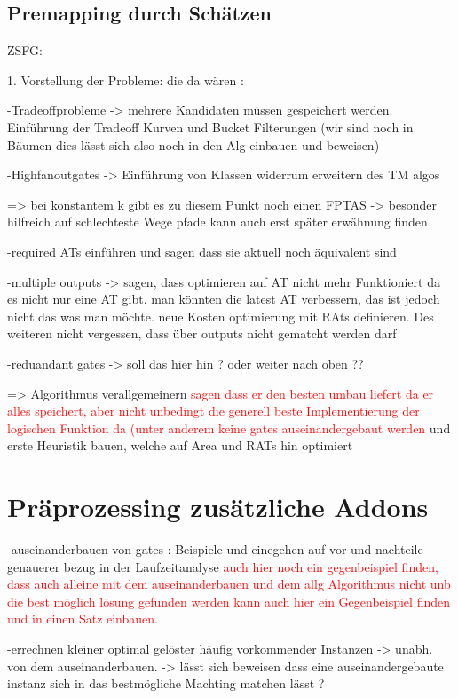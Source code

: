 \documentclass[11pt, a4paper, german]{article}
\begin{document}
\subsection{Premapping durch Schätzen}
\label{subsec:neinhierfrnochkeinlabel}
 

\newpage

ZSFG:

1. Vorstellung der Probleme: die da wären :

	-Tradeoffprobleme -> mehrere Kandidaten müssen gespeichert werden. Einführung der Tradeoff Kurven und Bucket Filterungen (wir sind noch in Bäumen dies lässt sich also noch in den Alg einbauen und beweisen) 
	
	-Highfanoutgates -> Einführung von Klassen widerrum erweitern des TM algos 
	
	=> bei konstantem k gibt es zu diesem Punkt noch einen FPTAS -> besonder hilfreich auf schlechteste Wege pfade kann auch erst später erwähnung finden
	
	-required ATs einführen und sagen dass sie aktuell noch äquivalent sind 
	
	-multiple outputs -> sagen, dass optimieren auf AT nicht mehr Funktioniert da es nicht nur eine AT gibt. man könnten die latest AT verbessern, das ist jedoch nicht das was man möchte. neue Kosten optimierung mit RAts definieren. Des weiteren nicht vergessen, dass über outputs nicht gematcht werden darf 
	
	-reduandant gates -> soll das hier hin ? oder weiter nach oben ??
	
	=> Algorithmus verallgemeinern \textcolor{red}{sagen dass er den besten umbau liefert da er alles speichert, aber nicht unbedingt die generell beste Implementierung der logischen Funktion da (unter anderem keine gates auseinandergebaut werden} und erste Heuristik bauen, welche auf Area  und RATs hin optimiert

\section{Präprozessing  zusätzliche Addons}
-auseinanderbauen von gates : Beispiele und einegehen auf vor und nachteile genauerer bezug in der Laufzeitanalyse \textcolor{red}{auch hier noch ein gegenbeispiel finden, dass auch alleine mit dem auseinanderbauen und dem allg Algorithmus nicht unb die best möglich lösung gefunden werden kann auch hier ein Gegenbeispiel finden und in einen Satz einbauen.}
	
	-errechnen kleiner optimal gelöster häufig vorkommender Instanzen -> unabh. von dem auseinanderbauen.  -> lässt sich beweisen dass eine auseinandergebaute instanz sich in das bestmögliche Machting matchen lässt ? 
	
\end{document}
